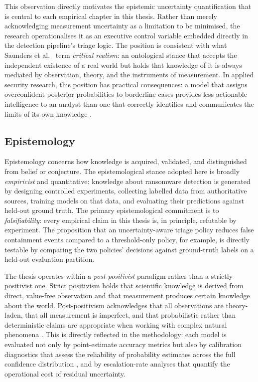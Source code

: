 This observation directly motivates the epistemic uncertainty quantification that is central to
each empirical chapter in this thesis.
Rather than merely acknowledging measurement uncertainty as a limitation to be minimised, the
research operationalises it as an executive control variable embedded directly in the detection
pipeline's triage logic.
The position is consistent with what Saunders et al.\ \cite{saunders2019research} term
\emph{critical realism}: an ontological stance that accepts the independent existence of a real
world but holds that knowledge of it is always mediated by observation, theory, and the instruments
of measurement.
In applied security research, this position has practical consequences: a model that assigns
overconfident posterior probabilities to borderline cases provides less actionable intelligence to
an analyst than one that correctly identifies and communicates the limits of its own
knowledge \cite{gawlikowski2023Uncertainity, Doan2024uncertainBay}.

\subsection{Epistemology}
\label{sec:epistemology}

Epistemology concerns how knowledge is acquired, validated, and distinguished from belief or
conjecture.
The epistemological stance adopted here is broadly \emph{empiricist} and quantitative: knowledge
about ransomware detection is generated by designing controlled experiments, collecting labelled
data from authoritative sources, training models on that data, and evaluating their predictions
against held-out ground truth.
The primary epistemological commitment is to \emph{falsifiability}: every empirical claim in this
thesis is, in principle, refutable by experiment.
The proposition that an uncertainty-aware triage policy reduces false containment events compared to
a threshold-only policy, for example, is directly testable by comparing the two policies' decisions
against ground-truth labels on a held-out evaluation partition.

The thesis operates within a \emph{post-positivist} paradigm rather than a strictly positivist one.
Strict positivism holds that scientific knowledge is derived from direct, value-free observation and
that measurement produces certain knowledge about the world.
Post-positivism acknowledges that all observations are theory-laden, that all measurement is
imperfect, and that probabilistic rather than deterministic claims are appropriate when working with
complex natural phenomena \cite{saunders2019research}.
This is directly reflected in the methodology: each model is evaluated not only by point-estimate
accuracy metrics but also by calibration diagnostics that assess the reliability of probability
estimates across the full confidence distribution \cite{guo2017calibration}, and by escalation-rate
analyses that quantify the operational cost of residual uncertainty.

